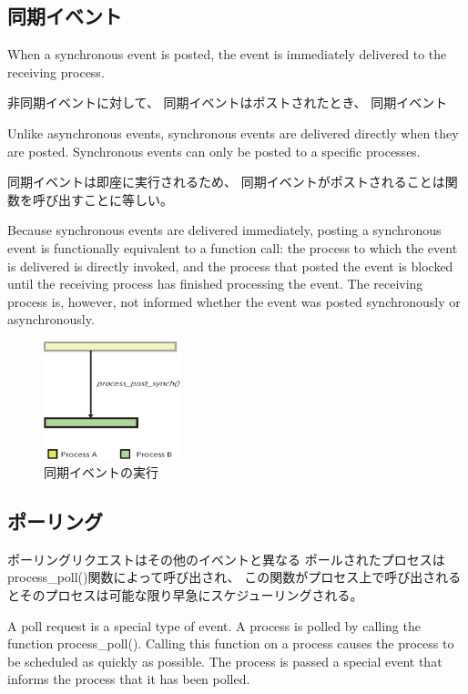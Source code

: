\subsection{同期イベント}
When a synchronous event is posted, the event is immediately delivered to the receiving process.

非同期イベントに対して、
同期イベントはポストされたとき、
同期イベント

Unlike asynchronous events, 
synchronous events are delivered directly when they are posted.
Synchronous events can only be posted to a specific processes.

同期イベントは即座に実行されるため、
同期イベントがポストされることは関数を呼び出すことに等しい。

Because synchronous events are delivered immediately,
posting a synchronous event is functionally equivalent to a function call: 
the process to which the event is delivered is directly invoked, 
and the process that posted the event is blocked until the receiving process has finished processing the event.
The receiving process is, however, not informed whether the event was posted synchronously or asynchronously.
\begin{figure}[htbp]
 \begin{center}
  \includegraphics[width=40mm]{./images/synchronous_event.eps}
 \end{center}
 \caption{同期イベントの実行}
 \label{fig:synchronous_event}
\end{figure}


\subsection{ポーリング}
ポーリングリクエストはその他のイベントと異なる
ポールされたプロセスはprocess\_poll()関数によって呼び出され、
この関数がプロセス上で呼び出されるとそのプロセスは可能な限り早急にスケジューリングされる。

A poll request is a special type of event. A process is polled by calling the function process\_poll().
Calling this function on a process causes the process to be scheduled as quickly as possible.
The process is passed a special event that informs the process that it has been polled.

